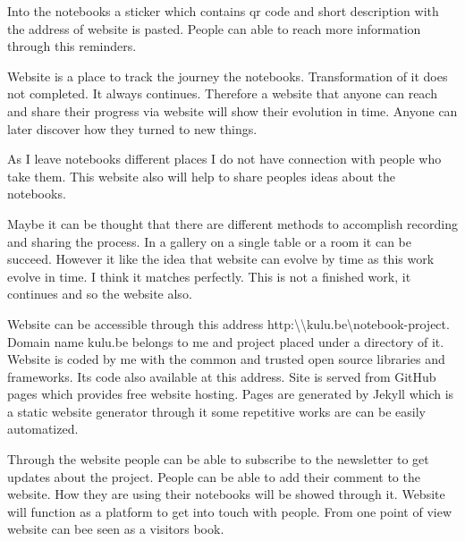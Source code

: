 Into the notebooks a sticker which contains qr code and short description with the address of website is pasted. People can able to reach more information through this reminders. 


Website is a place to track the journey the notebooks. Transformation of it does not completed. It always continues. Therefore a website that anyone can reach and share their progress via website will show their evolution in time. Anyone can later discover how they turned to new things.

As I leave notebooks different places I do not have connection with people who take them. This website also will help to share peoples ideas about the notebooks.

Maybe it can be thought that there are different methods to accomplish recording and sharing the process. In a gallery on a single table or a room it can be succeed. However it like the idea that website can evolve by time as this work evolve in time. I think it matches perfectly. This is not a finished work, it continues and so the website also.


Website can be accessible through this address http:\textbackslash\textbackslash kulu.be\textbackslash notebook-project. Domain name kulu.be belongs to me and project placed under a directory of it. Website is coded by me with the common and trusted open source libraries and frameworks. Its code also available at this address. Site is served from GitHub pages which provides free website hosting. Pages are generated by Jekyll which is a static website generator through it some repetitive works are can be easily automatized. 

Through the website people can be able to subscribe to the newsletter to get updates about the project. People can be able to add their comment to the website. How they are using their notebooks will be showed through it. Website will function as a platform to get into touch with people. From one point of view website can bee seen as a visitors book.

